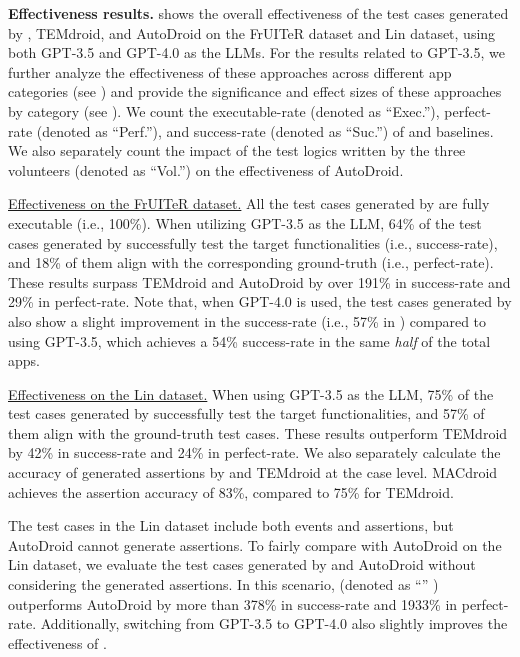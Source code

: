 \textbf{Effectiveness results.} 
 shows the overall effectiveness of the test cases generated by \toolNameSmall{}, TEMdroid, and AutoDroid on the FrUITeR dataset and Lin dataset, using both GPT-3.5 and GPT-4.0 as the LLMs.
For the results related to GPT-3.5, we further analyze the effectiveness of these approaches across different app categories (see ) and provide the significance and effect sizes of these approaches by category (see ).
We count the executable-rate (denoted as ``Exec.''), perfect-rate (denoted as ``Perf.''), and success-rate (denoted as ``Suc.'') of \toolNameSmall{} and baselines. 
We also separately count the impact of the test logics written by the three volunteers (denoted as ``Vol.'') on the effectiveness of AutoDroid.








\underline{Effectiveness on the FrUITeR dataset.} All the test cases generated by \toolNameSmall{} are fully executable (i.e., 100\%). When utilizing GPT-3.5 as the LLM, 64\% of the test cases generated by \toolNameSmall{} successfully test the target functionalities (i.e., success-rate), and 18\% of them align with the corresponding ground-truth (i.e., perfect-rate). These results surpass TEMdroid and AutoDroid by over 191\% in success-rate and 29\% in perfect-rate. 
Note that, when GPT-4.0 is used, the test cases generated by \toolNameSmall{} also show a slight improvement in the success-rate (i.e., 57\% in ) compared to using GPT-3.5, which achieves a 54\% success-rate in the same \emph{half} of the total apps.



\underline{Effectiveness on the Lin dataset.} When using GPT-3.5 as the LLM, 75\% of the test cases generated by \toolNameSmall{} successfully test the target functionalities, and 57\% of them align with the ground-truth test cases. These results outperform TEMdroid by 42\% in success-rate and 24\% in perfect-rate. 
We also separately calculate the accuracy of generated assertions by \toolNameSmall{} and TEMdroid at the case level. MACdroid achieves the assertion accuracy of 83\%, compared to 75\% for TEMdroid.



The test cases in the Lin dataset include both events and assertions, but AutoDroid cannot generate assertions. To fairly compare \toolNameSmall{} with AutoDroid on the Lin dataset, we evaluate the test cases generated by \toolNameSmall{} and AutoDroid without considering the generated assertions. 
In this scenario, \toolNameSmall{} (denoted as ``\toolNameplain{*}'' ) outperforms AutoDroid by more than 378\% in success-rate and 1933\% in perfect-rate. 
Additionally, switching from GPT-3.5 to GPT-4.0 also slightly improves the effectiveness of \toolNameSmall{}.

